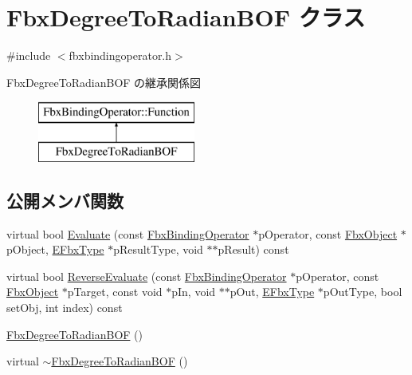 \hypertarget{class_fbx_degree_to_radian_b_o_f}{}\section{Fbx\+Degree\+To\+Radian\+B\+OF クラス}
\label{class_fbx_degree_to_radian_b_o_f}


{\ttfamily \#include $<$fbxbindingoperator.\+h$>$}

Fbx\+Degree\+To\+Radian\+B\+OF の継承関係図\begin{figure}[H]
\begin{center}
\leavevmode
\includegraphics[height=2.000000cm]{class_fbx_degree_to_radian_b_o_f}
\end{center}
\end{figure}
\subsection*{公開メンバ関数}
\begin{DoxyCompactItemize}
\item 
virtual bool \hyperlink{class_fbx_degree_to_radian_b_o_f_a6cee9578c7edb1b27f90f72ac9ec7000}{Evaluate} (const \hyperlink{class_fbx_binding_operator}{Fbx\+Binding\+Operator} $\ast$p\+Operator, const \hyperlink{class_fbx_object}{Fbx\+Object} $\ast$p\+Object, \hyperlink{fbxpropertytypes_8h_a73913a5ddfb20e57c6f25e9e6784bd92}{E\+Fbx\+Type} $\ast$p\+Result\+Type, void $\ast$$\ast$p\+Result) const
\item 
virtual bool \hyperlink{class_fbx_degree_to_radian_b_o_f_a65c7f3fdae835f27e123b2efc8aaf9da}{Reverse\+Evaluate} (const \hyperlink{class_fbx_binding_operator}{Fbx\+Binding\+Operator} $\ast$p\+Operator, const \hyperlink{class_fbx_object}{Fbx\+Object} $\ast$p\+Target, const void $\ast$p\+In, void $\ast$$\ast$p\+Out, \hyperlink{fbxpropertytypes_8h_a73913a5ddfb20e57c6f25e9e6784bd92}{E\+Fbx\+Type} $\ast$p\+Out\+Type, bool set\+Obj, int index) const
\item 
\hyperlink{class_fbx_degree_to_radian_b_o_f_a5ec303303a760400996c0115264ca4ad}{Fbx\+Degree\+To\+Radian\+B\+OF} ()
\item 
virtual \hyperlink{class_fbx_degree_to_radian_b_o_f_a4cc35e7abc17e6a76ba7c5857a5f34bd}{$\sim$\+Fbx\+Degree\+To\+Radian\+B\+OF} ()
\end{DoxyCompactItemize}
